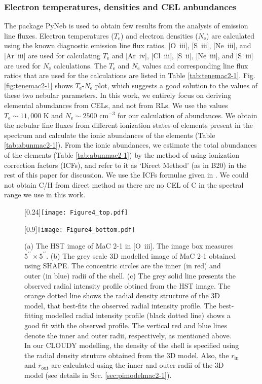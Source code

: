 \documentclass[a4paper,fleqn,usenatbib]{mnras}
\begin{document}
\subsubsection{Electron temperatures, densities and CEL anbundances} \label{sec:pynebmac2-1} 
The package PyNeb \citep{2015A&A...573A..42L} is used to obtain few results from the analysis of emission line fluxes. Electron temperatures ($T_\mathrm{e}$) and electron densities ($N_\mathrm{e}$) are calculated using the known diagnostic emission line flux ratios. [O~{\sc iii}], [S~{\sc iii}], [Ne~{\sc iii}], and [Ar~{\sc iii}] are used for calculating $T_\mathrm{e}$ and [Ar~{\sc iv}], [Cl~{\sc iii}], [S~{\sc ii}], [Ne~{\sc iii}], and [S~{\sc iii}] are used for $N_\mathrm{e}$ calculations. The $T_\mathrm{e}$ and $N_\mathrm{e}$ values and corresponding line flux ratios that are used for the calculations are listed in Table \ref{tab:tenemac2-1}. Fig. \ref{fig:tenemac2-1} shows $T_\mathrm{e}$-$N_\mathrm{e}$ plot, which suggests a good solution to the values of these two nebular parameters. In this work, we entirely focus on deriving elemental abundances from CELs, and not from RLs. We use the values $T_\mathrm{e}\sim11,000$ K and $N_\mathrm{e}\sim2500$ cm$^{-3}$ for our calculation of abundances. We obtain the nebular line fluxes from different ionization states of elements present in the spectrum and calculate the ionic abundances of the elements (Table \ref{tab:abunmac2-1}). From the ionic abundances, we estimate the total abundances of the elements (Table \ref{tab:abunmac2-1}) by the method of using ionization correction factors (ICFs), and refer to it as `Direct Method' (as in B20) in the rest of this paper for discussion. We use the ICFs formulae given in \citet{2014MNRAS.440..536D}. We could not obtain C/H from direct method as there are no CEL of C in the spectral range we use in this work. 

\begin{figure}
\centering
\scalebox{0.24}[0.24]{\texttt{[image: Figure4\_top.pdf]}}

\scalebox{0.9}[0.9]{\texttt{[image: Figure4\_bottom.pdf]}}
 \caption{(a) The HST image of MaC 2-1 in [O~{\sc iii}]. The image box measures $5^{\prime\prime}\times5^{\prime\prime}$. (b) The grey scale 3D modelled image of MaC 2-1 obtained using SHAPE. The concentric circles are the inner (in red) and outer (in blue) radii of the shell. (c) The grey solid line presents the observed radial intensity profile obtined from the HST image. The orange dotted line shows the radial density structure of the 3D model, that best-fits the observed radial intensity profile. The best-fitting modelled radial intensity profile (black dotted line) shows a good fit with the observed profile. The vertical red and blue lines denote the inner and outer radii, respectively, as mentioned above. In our CLOUDY modelling, the density of the shell is specified using the radial density struture obtained from the 3D model. Also, the $r_\mathrm{in}$ and $r_\mathrm{out}$ are calculated using the inner and outer radii of the 3D model (see details in Sec. \ref{sec:pimodelmac2-1}). \label{fig:denprofilemac2-1}}
\end{figure} 
\end{document}
